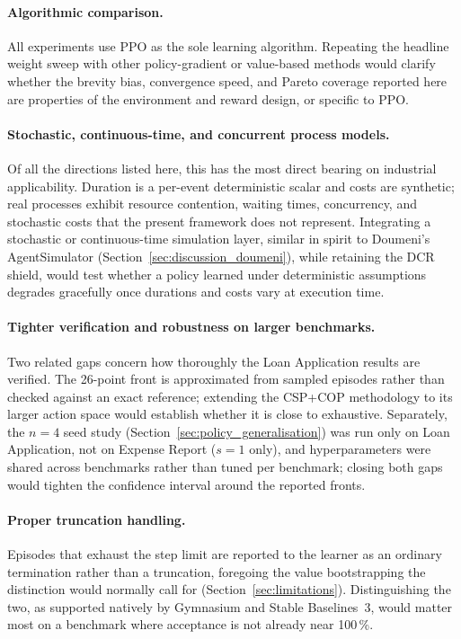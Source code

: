 \paragraph{Algorithmic comparison.} All experiments use \ac{PPO} as the sole learning algorithm. Repeating the headline weight sweep with other policy-gradient or value-based methods would clarify whether the brevity bias, convergence speed, and Pareto coverage reported here are properties of the environment and reward design, or specific to \ac{PPO}.

\paragraph{Stochastic, continuous-time, and concurrent process models.} Of all the directions listed here, this has the most direct bearing on industrial applicability. Duration is a per-event deterministic scalar and costs are synthetic; real processes exhibit resource contention, waiting times, concurrency, and stochastic costs that the present framework does not represent. Integrating a stochastic or continuous-time simulation layer, similar in spirit to Doumeni's AgentSimulator (Section~\ref{sec:discussion_doumeni}), while retaining the \ac{DCR} shield, would test whether a policy learned under deterministic assumptions degrades gracefully once durations and costs vary at execution time.

\paragraph{Tighter verification and robustness on larger benchmarks.} Two related gaps concern how thoroughly the Loan Application results are verified. The 26-point front is approximated from sampled episodes rather than checked against an exact reference; extending the CSP+COP methodology to its larger action space would establish whether it is close to exhaustive. Separately, the $n=4$ seed study (Section~\ref{sec:policy_generalisation}) was run only on Loan Application, not on Expense Report ($s=1$ only), and hyperparameters were shared across benchmarks rather than tuned per benchmark; closing both gaps would tighten the confidence interval around the reported fronts.

\paragraph{Proper truncation handling.} Episodes that exhaust the step limit are reported to the learner as an ordinary termination rather than a truncation, foregoing the value bootstrapping the distinction would normally call for (Section~\ref{sec:limitations}). Distinguishing the two, as supported natively by Gymnasium and Stable Baselines~3, would matter most on a benchmark where acceptance is not already near 100\,\%.

